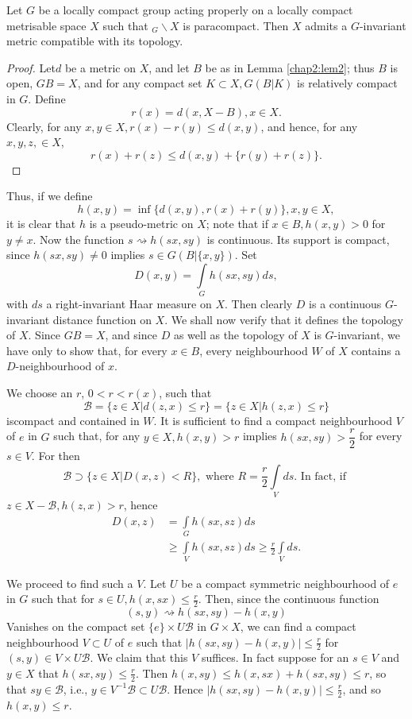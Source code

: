 \begin{thm}%
  Let $G$ be a locally compact group acting properly on a locally
  compact metrisable space $X$ such that $_G \backslash X$ is
  paracompact. Then $X$ admits a $G$-invariant metric compatible with
  its topology. 
\end{thm}

\begin{proof}
  Let\pageoriginale $d$ be a metric on $X$, and let $B$ be as in Lemma
  \ref{chap2:lem2}; thus $B$ 
  is open, $GB=X$, and for any compact set $K \subset X, G(B | K)$ is
  relatively compact in $G$. Define 
  $$
  r(x)=d(x, X - B), x \in X.
  $$
  Clearly, for any $x, y \in X, r (x) - r(y) \leq d(x, y)$, and hence,
  for any $x, y, z, \in X$, 
  $$
  r(x) + r(z) \leq d(x, y) + \{r(y) + r(z) \}.
  $$
\end{proof}

Thus, if we define
$$
h(x, y)= \inf\{d(x, y), r(x)+r(y)\}, x,y \in X,
$$
it is clear that $h$ is a pseudo-metric on $X$; note that if $x \in B,
h(x, y)>0$ for $y \neq x$. Now the function $s \rightsquigarrow h(sx,
sy)$ is continuous. Its support is compact, since $h(sx, sy)\neq 0$
implies $s \in G(B|\{x, y\})$. Set 
$$
D(x, y) = \int\limits_G h (sx, sy)ds,
$$
with $ds$ a right-invariant Haar measure on $X$. Then clearly $D$ is a
continuous $G$-invariant distance function on $X$. We shall now verify
that it defines the topology of $X$. Since $GB = X$, and since $D$ as
well as the topology of $X$ is $G$-invariant, we have only to show
that, for every $x \in B$, every neighbourhood $W$ of $X$ contains a
$D$-neighbourhood of $x$. 

We choose an $r$, $0 < r < r(x)$, such that
$$
\mathscr{B} = \{z \in X | d (z, x) \leq r\} = \{z \in X | h(z, x) \leq
r \} 
$$
is\pageoriginale compact and contained in $W$. It is sufficient to find a compact
neighbourhood $V$ of $e$ in $G$ such that, for any $y \in X, h(x, y)>
r$ implies $h(sx, sy) > \dfrac{r}{2}$ for every $s \in V$. For then 
$$
\mathscr{B} \supset \{z \in X | D(x, z) < R\}, \text{ where }R =
\frac{r}{2}\int\limits_V ds. \text{ In fact, if } 
$$
$z \in X- \mathscr{B}, h(z, x)> r$, hence 
\begin{align*}
  D(x, z) &= \int\limits_G h(sx, sz)ds\\
  & \geq \int\limits_V h(sx, sz) ds \geq \frac{r}{2}\int\limits_V ds.
\end{align*}

We proceed to find such a $V$. Let $U$ be a compact symmetric
neighbourhood of $e$ in $G$ such that for $s \in U,h(x, sx) \leq
\frac{r}{2}$. Then, since the continuous function 
$$
(s, y)\rightsquigarrow h(sx, sy)-h(x, y)
$$
Vanishes on the compact set $\{ e \}\times U \mathscr{B}$ in $G \times
X$, we can find a compact  neighbourhood $V \subset U$ of $e$ such
that $| h(sx, sy)-h(x, y)|\leq \frac{r}{2}$ for $(s, y)\in V \times
U\mathscr{B}$. We claim that this $V$ suffices. In fact suppose for an
$s \in V$ and $y \in X$ that $h(sx, sy) \leq \frac{r}{2}$. Then $h(x,
sy) \leq h(x, sx)+h(sx, sy)\leq r$, so that $sy \in \mathscr{B}$,
i.e., $y \in V^{-1}\mathscr{B}\subset U \mathscr{B}$. Hence $|h(sx,
sy)-h(x, y)| \leq \frac{r}{2}$, and so $h(x, y) \leq r$. 

